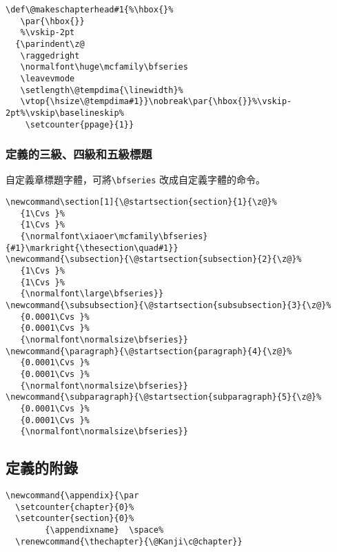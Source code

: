 \begin{lstlisting}[firstnumber=927]
\def\@makeschapterhead#1{%\hbox{}%
   \par{\hbox{}}
   %\vskip-2pt
  {\parindent\z@
   \raggedright
   \normalfont\huge\mcfamily\bfseries
   \leavevmode
   \setlength\@tempdima{\linewidth}%
   \vtop{\hsize\@tempdima#1}}\nobreak\par{\hbox{}}%\vskip-2pt%\vskip\baselineskip%
    \setcounter{ppage}{1}}
\end{lstlisting}


\subsubsection{定義的三級、四級和五級標題}

\par 自定義章標題字體，可將\verb+\bfseries+ 改成自定義字體的命令。
\begin{lstlisting}[firstnumber=1003]
\newcommand\section[1]{\@startsection{section}{1}{\z@}%
   {1\Cvs }%
   {1\Cvs }%
   {\normalfont\xiaoer\mcfamily\bfseries}{#1}\markright{\thesection\quad#1}}
\newcommand{\subsection}{\@startsection{subsection}{2}{\z@}%
   {1\Cvs }%
   {1\Cvs }%
   {\normalfont\large\bfseries}}
\newcommand{\subsubsection}{\@startsection{subsubsection}{3}{\z@}%
   {0.0001\Cvs }%
   {0.0001\Cvs }%
   {\normalfont\normalsize\bfseries}}
\newcommand{\paragraph}{\@startsection{paragraph}{4}{\z@}%
   {0.0001\Cvs }%
   {0.0001\Cvs }%
   {\normalfont\normalsize\bfseries}}
\newcommand{\subparagraph}{\@startsection{subparagraph}{5}{\z@}%
   {0.0001\Cvs }%
   {0.0001\Cvs }%
   {\normalfont\normalsize\bfseries}}
\end{lstlisting}

\subsection{定義的附錄}

\begin{lstlisting}[firstnumber=1024]
\newcommand{\appendix}{\par
  \setcounter{chapter}{0}%
  \setcounter{section}{0}%
        {\appendixname}  \space%
  \renewcommand{\thechapter}{\@Kanji\c@chapter}}
\end{lstlisting}

